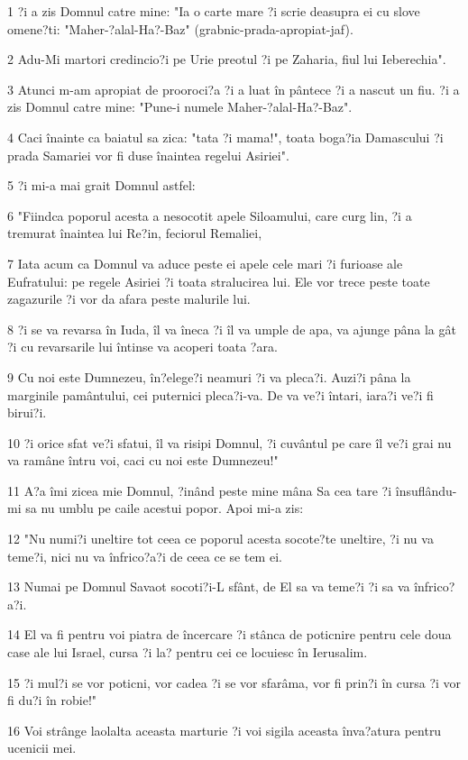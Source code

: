 \par 1 ?i a zis Domnul catre mine: "Ia o carte mare ?i scrie deasupra ei cu slove omene?ti: "Maher-?alal-Ha?-Baz" (grabnic-prada-apropiat-jaf).
\par 2 Adu-Mi martori credincio?i pe Urie preotul ?i pe Zaharia, fiul lui Ieberechia".
\par 3 Atunci m-am apropiat de prooroci?a ?i a luat în pântece ?i a nascut un fiu. ?i a zis Domnul catre mine: "Pune-i numele Maher-?alal-Ha?-Baz".
\par 4 Caci înainte ca baiatul sa zica: "tata ?i mama!", toata boga?ia Damascului ?i prada Samariei vor fi duse înaintea regelui Asiriei".
\par 5 ?i mi-a mai grait Domnul astfel:
\par 6 "Fiindca poporul acesta a nesocotit apele Siloamului, care curg lin, ?i a tremurat înaintea lui Re?in, feciorul Remaliei,
\par 7 Iata acum ca Domnul va aduce peste ei apele cele mari ?i furioase ale Eufratului: pe regele Asiriei ?i toata stralucirea lui. Ele vor trece peste toate zagazurile ?i vor da afara peste malurile lui.
\par 8 ?i se va revarsa în Iuda, îl va îneca ?i îl va umple de apa, va ajunge pâna la gât ?i cu revarsarile lui întinse va acoperi toata ?ara.
\par 9 Cu noi este Dumnezeu, în?elege?i neamuri ?i va pleca?i. Auzi?i pâna la marginile pamântului, cei puternici pleca?i-va. De va ve?i întari, iara?i ve?i fi birui?i.
\par 10 ?i orice sfat ve?i sfatui, îl va risipi Domnul, ?i cuvântul pe care îl ve?i grai nu va ramâne întru voi, caci cu noi este Dumnezeu!"
\par 11 A?a îmi zicea mie Domnul, ?inând peste mine mâna Sa cea tare ?i însuflându-mi sa nu umblu pe caile acestui popor. Apoi mi-a zis:
\par 12 "Nu numi?i uneltire tot ceea ce poporul acesta socote?te uneltire, ?i nu va teme?i, nici nu va înfrico?a?i de ceea ce se tem ei.
\par 13 Numai pe Domnul Savaot socoti?i-L sfânt, de El sa va teme?i ?i sa va înfrico?a?i.
\par 14 El va fi pentru voi piatra de încercare ?i stânca de poticnire pentru cele doua case ale lui Israel, cursa ?i la? pentru cei ce locuiesc în Ierusalim.
\par 15 ?i mul?i se vor poticni, vor cadea ?i se vor sfarâma, vor fi prin?i în cursa ?i vor fi du?i în robie!"
\par 16 Voi strânge laolalta aceasta marturie ?i voi sigila aceasta înva?atura pentru ucenicii mei.
